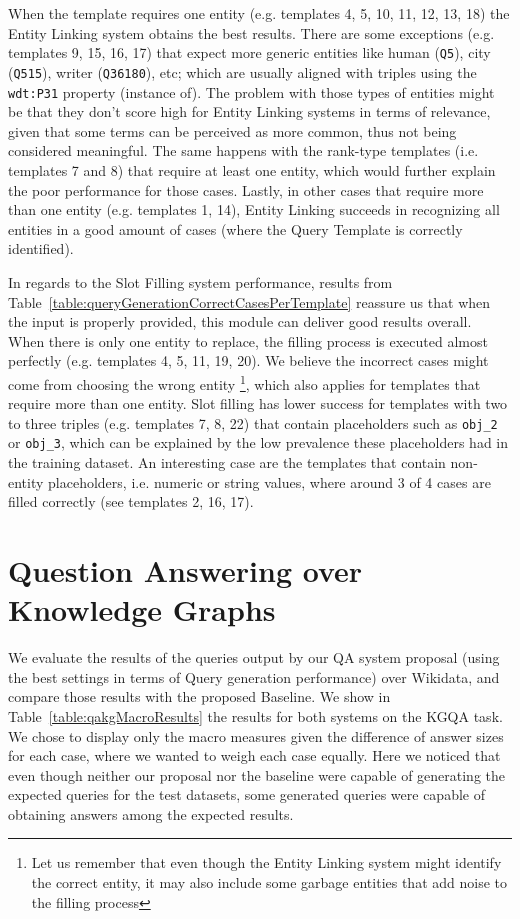 When the template requires one entity (e.g. templates 4, 5, 10, 11, 12, 13, 18) the Entity 
Linking system obtains the best results. There are some exceptions (e.g. templates 9, 15, 
16, 17) that expect more generic entities like human (\texttt{Q5}), city (\texttt{Q515}), 
writer (\texttt{Q36180}), etc; which are usually aligned with triples using the \texttt{wdt:P31} 
property (instance of). The problem with those types of entities might be that they don’t 
score high for Entity Linking systems in terms of relevance, given that some terms can be 
perceived as more common, thus not being considered meaningful. The same happens with the 
rank-type templates (i.e. templates 7 and 8) that require at least one  
entity, which would further explain the poor performance for those cases. Lastly, in other 
cases that require more than one entity (e.g. templates 1, 14), Entity Linking succeeds in 
recognizing all entities in a good amount of cases (where the Query Template is correctly 
identified).

In regards to the Slot Filling system performance, results from 
Table~\ref{table:queryGenerationCorrectCasesPerTemplate} reassure us that when the input is 
properly provided, this module can deliver good results overall. When there is only one 
entity to replace, the filling process is executed almost perfectly (e.g. templates 4, 5, 
11, 19, 20). We believe the incorrect cases might come from choosing the wrong entity
\footnote{Let us remember that even though the Entity Linking system might identify the 
correct entity, it may also include some garbage entities that add noise to the filling 
process}, which also applies for templates that require more than one entity. Slot filling 
has lower success for templates with two to three triples (e.g. templates 7, 8, 22) that 
contain placeholders such as \texttt{obj\_2} or \texttt{obj\_3}, which can be explained 
by the low prevalence these placeholders had in the training dataset. An interesting case 
are the templates that contain non-entity placeholders, i.e. numeric or string values, 
where around 3 of 4 cases are filled correctly (see templates 2, 16, 17).

\section{Question Answering over Knowledge Graphs}
\label{cap5:results/questionAnsweringKG}
We evaluate the results of the \SPARQL{} queries output by our QA system proposal (using the best 
settings in terms of \SPARQL{} Query generation performance) over Wikidata, and compare those results 
with the proposed Baseline. We show in Table~\ref{table:qakgMacroResults} the results for both 
systems on  the KGQA task. We chose to display only the macro measures given the difference of answer 
sizes for each case, where we wanted to weigh each case equally. Here we noticed that even though 
neither our proposal nor the baseline were capable of generating the expected \SPARQL{} queries for 
the test datasets, some generated \SPARQL{} queries were capable of obtaining answers among the 
expected results. 

